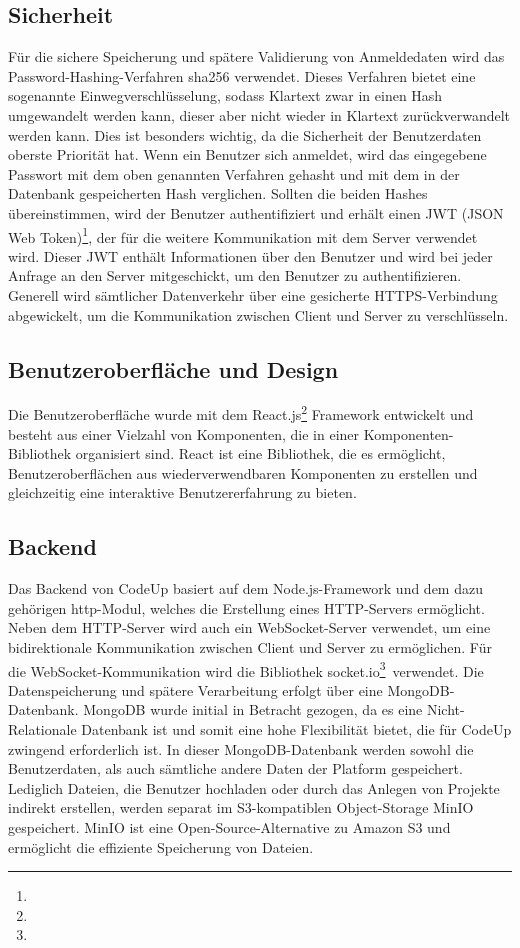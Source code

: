 \documentclass[main.tex]{subfiles}
\begin{document}
    \subsection{Sicherheit}
    Für die sichere Speicherung und spätere Validierung von Anmeldedaten wird das Password-Hashing-Verfahren sha256 verwendet.
    Dieses Verfahren bietet eine sogenannte Einwegverschlüsselung, sodass Klartext zwar in einen Hash umgewandelt werden kann, dieser aber nicht wieder in Klartext zurückverwandelt werden kann.
    Dies ist besonders wichtig, da die Sicherheit der Benutzerdaten oberste Priorität hat.
    Wenn ein Benutzer sich anmeldet, wird das eingegebene Passwort mit dem oben genannten Verfahren gehasht und mit dem in der Datenbank gespeicherten Hash verglichen.
    Sollten die beiden Hashes übereinstimmen, wird der Benutzer authentifiziert und erhält einen JWT (JSON Web Token)\footnote{}, der für die weitere Kommunikation mit dem Server verwendet wird.
    Dieser JWT enthält Informationen über den Benutzer und wird bei jeder Anfrage an den Server mitgeschickt, um den Benutzer zu authentifizieren.
    Generell wird sämtlicher Datenverkehr über eine gesicherte HTTPS-Verbindung abgewickelt, um die Kommunikation zwischen Client und Server zu verschlüsseln.

    \subsection{Benutzeroberfläche und Design}
    Die Benutzeroberfläche wurde mit dem React.js\footnote{} Framework entwickelt und besteht aus einer Vielzahl von Komponenten, die in einer Komponenten-Bibliothek organisiert sind.
    React ist eine Bibliothek, die es ermöglicht, Benutzeroberflächen aus wiederverwendbaren Komponenten zu erstellen und gleichzeitig eine interaktive Benutzererfahrung zu bieten.


    \subsection{Backend}
    Das Backend von CodeUp basiert auf dem Node.js-Framework und dem dazu gehörigen \dq http\dq-Modul, welches die Erstellung eines HTTP-Servers ermöglicht.
    Neben dem HTTP-Server wird auch ein WebSocket-Server verwendet, um eine bidirektionale Kommunikation zwischen Client und Server zu ermöglichen.
    Für die WebSocket-Kommunikation wird die Bibliothek \dq socket.io\dq \footnote{}\ verwendet.
    Die Datenspeicherung und spätere Verarbeitung erfolgt über eine MongoDB-Datenbank.
    MongoDB wurde initial in Betracht gezogen, da es eine Nicht-Relationale Datenbank ist und somit eine hohe Flexibilität bietet, die für CodeUp zwingend erforderlich ist.
    In dieser MongoDB-Datenbank werden sowohl die Benutzerdaten, als auch sämtliche andere Daten der Platform gespeichert.
    Lediglich Dateien, die Benutzer hochladen oder durch das Anlegen von Projekte indirekt erstellen, werden separat im S3-kompatiblen Object-Storage MinIO gespeichert.
    MinIO ist eine Open-Source-Alternative zu Amazon S3 und ermöglicht die effiziente Speicherung von Dateien.
\end{document}
